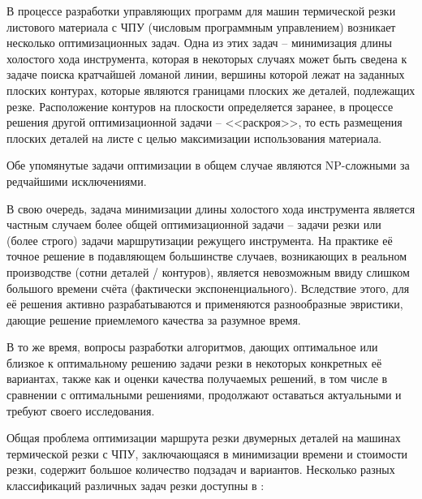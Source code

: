 \documentclass[14pt]{extarticle}
\theoremstyle{plain}%
\theoremstyle{remark}
\begin{document}
В процессе разработки управляющих программ
для машин термической резки
листового материала с ЧПУ
(числовым программным управлением)
возникает несколько оптимизационных задач.
Одна из этих задач --
минимизация длины холостого хода инструмента,
которая в некоторых случаях может
быть сведена к задаче поиска кратчайшей
ломаной линии,
вершины которой лежат на заданных плоских контурах,
которые являются границами плоских же деталей,
подлежащих резке.
Расположение контуров на плоскости
определяется заранее,
в процессе решения другой оптимизационной задачи --
<<раскроя>>,
то есть размещения плоских деталей на листе
с целью максимизации использования материала.

Обе упомянутые задачи оптимизации
в общем случае являются
NP-сложными
за редчайшими исключениями.

В свою очередь,
задача минимизации длины холостого хода инструмента
является частным случаем более общей оптимизационной задачи --
задачи резки или
(более строго)
задачи маршрутизации режущего инструмента.
На практике её точное решение
в подавляющем большинстве случаев,
возникающих в реальном производстве
(сотни деталей / контуров),
является невозможным ввиду
слишком большого времени счёта
(фактически экспоненциального).
Вследствие этого,
для её решения
активно разрабатываются и применяются
разнообразные эвристики,
дающие решение приемлемого
качества за разумное время.

В то же время,
вопросы разработки алгоритмов,
дающих оптимальное или близкое к оптимальному
решению задачи резки
в некоторых конкретных её вариантах,
также как и оценки качества получаемых решений,
в том числе в сравнении с оптимальными решениями,
продолжают оставаться актуальными и
требуют своего исследования.

Общая проблема оптимизации маршрута резки
двумерных деталей на машинах термической резки с ЧПУ,
заключающаяся в минимизации времени и стоимости резки,
содержит большое количество подзадач и вариантов.
Несколько разных классификаций различных задач резки
доступны в
\cite{bi01,bi02,bi03}:
\end{document}
